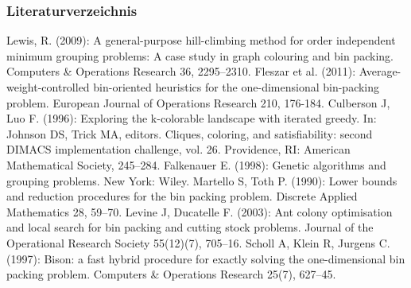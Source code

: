 \documentclass{beamer}
\begin{document}




\begin{frame}
\frametitle{Literaturverzeichnis}
\begin{scriptsize}
\begin{thebibliography}{1}
 Lewis, R. (2009): A general-purpose hill-climbing method for order independent minimum grouping problems: A case study in graph colouring and bin packing. Computers & Operations Research 36, 2295–2310.
 Fleszar et al. (2011): Average-weight-controlled bin-oriented heuristics for the one-dimensional
bin-packing problem. European Journal of Operations Research 210, 176-184.
 Culberson J, Luo F. (1996): Exploring the k-colorable landscape with iterated greedy.
In: Johnson DS, Trick MA, editors. Cliques, coloring, and satisfiability:
second DIMACS implementation challenge, vol. 26. Providence, RI: American
Mathematical Society, 245–284.
 Falkenauer E. (1998): Genetic algorithms and grouping problems. New York: Wiley.
 Martello S, Toth P. (1990): Lower bounds and reduction procedures for the bin packing
problem. Discrete Applied Mathematics 28, 59–70.
 Levine J, Ducatelle F. (2003): Ant colony optimisation and local search for bin packing
and cutting stock problems. Journal of the Operational Research Society 55(12)(7), 705–16.
 Scholl A, Klein R, Jurgens C. (1997): Bison: a fast hybrid procedure for exactly solving
the one-dimensional bin packing problem. Computers & Operations Research 25(7), 627–45.

\end{thebibliography}
\end{scriptsize}

\end{frame}




\end{document}
